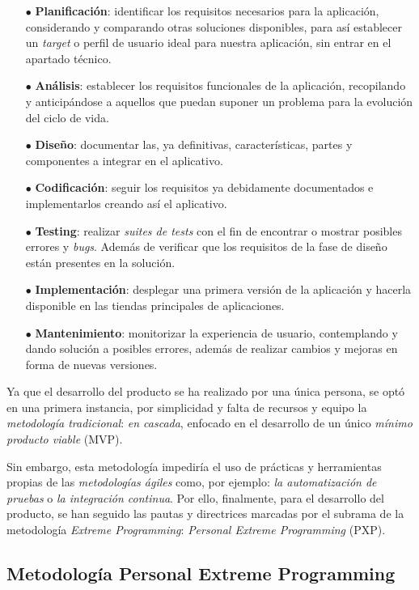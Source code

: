 \begin{itemize}
   \item[$\bullet$] \textbf{Planificación}: identificar los requisitos necesarios para la aplicación,
   considerando y comparando otras soluciones disponibles, para así establecer un \textit{target} o perfil de usuario ideal
   para nuestra aplicación, sin entrar en el apartado técnico.
   \item[$\bullet$] \textbf{Análisis}: establecer los requisitos funcionales de la aplicación, recopilando 
   y anticipándose a aquellos que puedan suponer un problema para la evolución del ciclo de vida.
   \item[$\bullet$] \textbf{Diseño}: documentar las, ya definitivas, características, partes y componentes a integrar en el aplicativo.
   \item[$\bullet$] \textbf{Codificación}: seguir los requisitos ya debidamente documentados e implementarlos creando así el aplicativo. 
   \item[$\bullet$] \textbf{Testing}: realizar \textit{suites de tests} con el fin de encontrar o mostrar
   posibles errores y \textit{bugs}. Además de verificar que los requisitos de la fase de diseño están presentes en la solución.  
   \item[$\bullet$] \textbf{Implementación}: desplegar una primera versión de la aplicación y hacerla disponible en las tiendas principales
   de aplicaciones. 
   \item[$\bullet$] \textbf{Mantenimiento}: monitorizar la experiencia de usuario, contemplando y dando solución a posibles errores,
   además de realizar cambios y mejoras en forma de nuevas versiones.
\end{itemize}

Ya que el desarrollo del producto se ha realizado por una única persona, se optó en una primera instancia, por simplicidad y falta de recursos y equipo
la \textit{metodología tradicional}: \textit{en cascada}, enfocado en el desarrollo de un único \textit{mínimo producto viable} (MVP).

Sin embargo, esta metodología impediría el uso de prácticas y herramientas propias de las \textit{metodologías ágiles} como, por ejemplo: \textit{la automatización de pruebas} o
\textit{la integración continua}. Por ello, finalmente, para el desarrollo del producto, se han seguido las pautas y directrices marcadas por el subrama de la metodología
\textit{Extreme Programming}: \textit{Personal Extreme Programming} (PXP).

\subsection{Metodología Personal Extreme Programming} %

